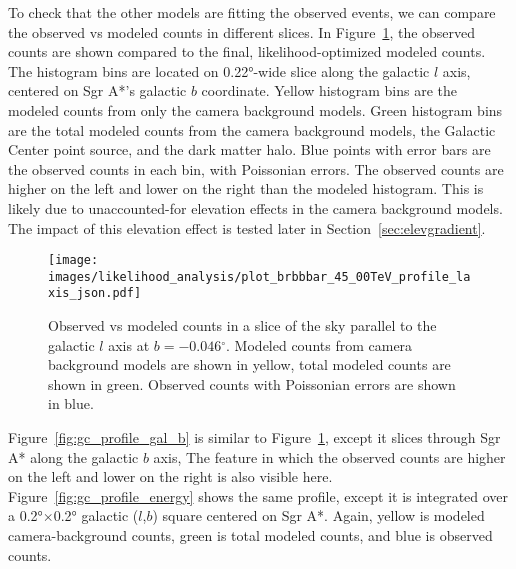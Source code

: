   To check that the other models are fitting the observed events, we can compare the observed vs modeled counts in different slices.
  In Figure~\ref{fig:gc_profile_gal_l}, the observed counts are shown compared to the final, likelihood-optimized modeled counts.
  The histogram bins are located on \ang{0.22}-wide slice along the galactic $l$ axis, centered on Sgr A*'s galactic $b$ coordinate.
  Yellow histogram bins are the modeled counts from only the camera background models.
  Green histogram bins are the total modeled counts from the camera background models, the Galactic Center point source, and the dark matter halo.
  Blue points with error bars are the observed counts in each bin, with Poissonian errors.
  The observed counts are higher on the left and lower on the right than the modeled histogram.
  This is likely due to unaccounted-for elevation effects in the camera background models.
  The impact of this elevation effect is tested later in Section~\ref{sec:elevgradient}.
  
  \begin{figure}[t]
    \centering
    \texttt{[image: images/likelihood\_analysis/plot\_brbbbar\_45\_00TeV\_profile\_laxis\_json.pdf]}
    \caption[Galactic Center Profile vs Galactic $l$]{
      Observed vs modeled counts in a slice of the sky parallel to the galactic $l$ axis at $b=-0.046{}^{\circ}$.
      Modeled counts from camera background models are shown in yellow, total modeled counts are shown in green.
      Observed counts with Poissonian errors are shown in blue.
    }
    \label{fig:gc_profile_gal_l}
  \end{figure}

  Figure~\ref{fig:gc_profile_gal_b} is similar to Figure~\ref{fig:gc_profile_gal_l}, except it slices through Sgr A* along the galactic $b$ axis,
  The feature in which the observed counts are higher on the left and lower on the right is also visible here.
  Figure~\ref{fig:gc_profile_energy} shows the same profile, except it is integrated over a \ang{0.2}$\times$\ang{0.2} galactic ($l$,$b$) square centered on Sgr A*.
  Again, yellow is modeled camera-background counts, green is total modeled counts, and blue is observed counts.

